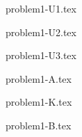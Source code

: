 \documentclass{article}
\begin{document}
{problem1-U1.tex}

{problem1-U2.tex}

{problem1-U3.tex}

{problem1-A.tex}

{problem1-K.tex}

{problem1-B.tex}
\end{document}
